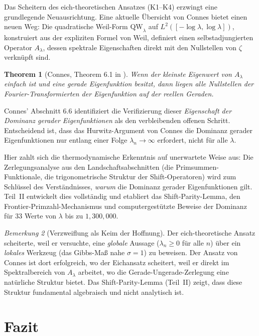 \documentclass[12pt,a4paper]{article}
\newtheorem{theorem}{Theorem}[section]
\theoremstyle{definition}
\theoremstyle{remark}
\newtheorem{remark}[theorem]{Bemerkung}
\begin{document}
Das Scheitern des eich-theoretischen Ansatzes (K1--K4) erzwingt eine grundlegende Neuausrichtung. Eine aktuelle Übersicht von Connes \cite{Connes2025} bietet einen neuen Weg: Die quadratische Weil-Form $\mathrm{QW}_\lambda$ auf $L^2([-\log\lambda, \log\lambda])$, konstruiert aus der expliziten Formel von Weil, definiert einen selbstadjungierten Operator $A_\lambda$, dessen spektrale Eigenschaften direkt mit den Nullstellen von $\zeta$ verknüpft sind.

\begin{theorem}[Connes, Theorem 6.1 in \cite{Connes2025}]
Wenn der kleinste Eigenwert von $A_\lambda$ einfach ist und eine gerade Eigenfunktion besitzt, dann liegen alle Nullstellen der Fourier-Transformierten der Eigenfunktion auf der reellen Geraden.
\end{theorem}

Connes' Abschnitt 6.6 identifiziert die Verifizierung dieser \emph{Eigenschaft der Dominanz gerader Eigenfunktionen} als den verbleibenden offenen Schritt. Entscheidend ist, dass das Hurwitz-Argument von Connes die Dominanz gerader Eigenfunktionen nur entlang einer Folge $\lambda_n \to \infty$ erfordert, nicht für alle $\lambda$.

Hier zahlt sich die thermodynamische Erkenntnis auf unerwartete Weise aus: Die Zerlegungsanalyse aus den Landschaftsabschnitten (die Primsummen-Funktionale, die trigonometrische Struktur der Shift-Operatoren) wird zum Schlüssel des Verständnisses, \emph{warum} die Dominanz gerader Eigenfunktionen gilt. Teil~II entwickelt dies vollständig und etabliert das Shift-Parity-Lemma, den Frontier-Primzahl-Mechanismus und computergestützte Beweise der Dominanz für 33 Werte von $\lambda$ bis zu $1{,}300{,}000$.

\begin{remark}[Verzweiflung als Keim der Hoffnung]
Der eich-theoretische Ansatz scheiterte, weil er versuchte, eine \emph{globale} Aussage ($\lambda_n \geq 0$ für alle $n$) über ein \emph{lokales} Werkzeug (das Gibbs-Maß nahe $\sigma = 1$) zu beweisen. Der Ansatz von Connes ist dort erfolgreich, wo der Eichansatz scheitert, weil er direkt im Spektralbereich von $A_\lambda$ arbeitet, wo die Gerade-Ungerade-Zerlegung eine natürliche Struktur bietet. Das Shift-Parity-Lemma (Teil~II) zeigt, dass diese Struktur fundamental algebraisch und nicht analytisch ist.
\end{remark}


\section{Fazit}
\label{sec:conclusion}
\end{document}
